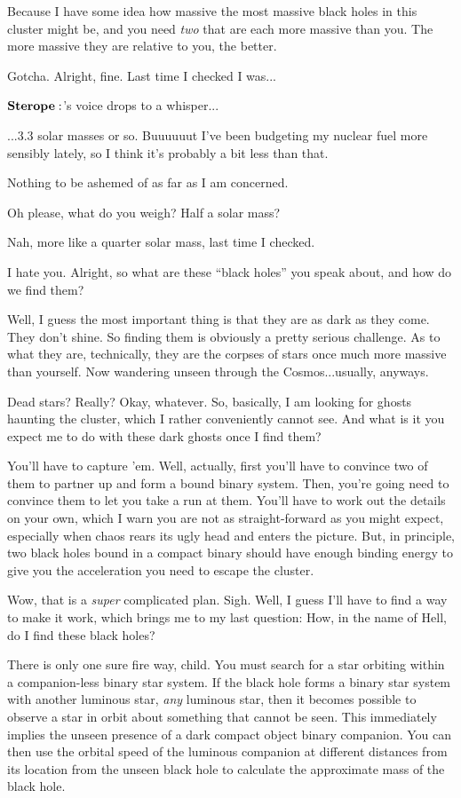 \Enrico Because I have some idea how massive the most massive black holes in this cluster might be, and you need \textit{two} that are each more massive than you.  The more massive they are relative to you, the better.

\Sterope Gotcha.  Alright, fine.  Last time I checked I was...

$\Sterope$'s voice drops to a whisper...

\Sterope ...3.3 solar masses or so.  Buuuuuut I've been budgeting my nuclear fuel more sensibly lately, so I think it's probably a bit less than that.  

\Enrico Nothing to be ashemed of as far as I am concerned.

\Sterope Oh please, what do you weigh?  Half a solar mass?

\Enrico Nah, more like a quarter solar mass, last time I checked.

\Sterope I hate you.  Alright, so what are these ``black holes'' you speak about, and how do we find them?

\Enrico Well, I guess the most important thing is that they are as dark as they come.  They don't shine.  So finding them is obviously a pretty serious challenge.  As to what they are, technically, they are the corpses of stars once much more massive than yourself.  Now wandering unseen through the Cosmos...usually, anyways.

\Sterope  Dead stars?  Really?  Okay, whatever.  So, basically, I am looking for ghosts haunting the cluster, which I rather conveniently cannot see.  And what is it you expect me to do with these dark ghosts once I find them?

\Enrico You'll have to capture 'em.  Well, actually, first you'll have to convince two of them to partner up and form a bound binary system.  Then, you're going need to convince them to let you take a run at them.  You'll have to work out the details on your own, which I warn you are not as straight-forward as you might expect, especially when chaos rears its ugly head and enters the picture.  But, in principle, two black holes bound in a compact binary should have enough binding energy to give you the acceleration you need to escape the cluster.  

\Sterope Wow, that is a \textit{super} complicated plan.  Sigh.  Well, I guess I'll have to find a way to make it work, which brings me to my last question:  How, in the name of Hell, do I find these black holes?

\Enrico There is only one sure fire way, child.  You must search for a star orbiting within a companion-less binary star system.  If the black hole forms a binary star system with another luminous star, \textit{any} luminous star, then it becomes possible to observe a star in orbit about something that cannot be seen.  This immediately implies the unseen presence of a dark compact object binary companion.  You can then use the orbital speed of the luminous companion at different distances from its location from the unseen black hole to calculate the approximate mass of the black hole.  

